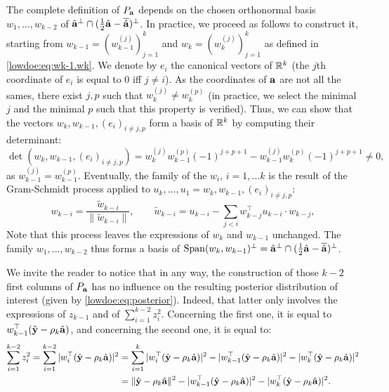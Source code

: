 {The complete definition of $P_{\mathbf{a}}$ depends on the chosen orthonormal basis $w_1,\dots,w_{k-2}$ of $\hat{\mathbf{a}}^\perp\cap(\frac{1}{2}\hat{\mathbf{a}}-\overline{\hat{\mathbf{a}}})^\perp$.
In practice, we proceed as follows to construct it, starting from $w_{k-1}=(w_{k-1}^{(j)})_{j=1}^k$ and $w_k=(w_k^{(j)})_{j=1}^k$ as defined in \cref{lowdoe:eq:wk-1.wk}. 
We denote by $e_i$ the canonical vectors of $\mathbb{R}^k$ (the $j$th coordinate of $e_i$ is equal to $0$ iff $j\ne i$). As the coordinates of $\mathbf{a}$ are not all the sames, there exist $j,p$ such that $w_{k}^{(j)}\ne w_{k}^{(p)}$ (in practice, we select the minimal $j$ and the minimal $p$ such that this property is verified). Thus, we can show that the vectors $w_k,w_{k-1},(e_i)_{i\ne j,p}$ form a basis of $\mathbb{R}^k$ by computing their determinant:
    \begin{equation}
        \det(w_k,w_{k-1},(e_i)_{i\ne j,p}) = w_k^{(j)}w_{k-1}^{(p)}(-1)^{j+p+1} - w_{k-1}^{(j)}w_k^{(p)}(-1)^{j+p+1}\ne 0,
    \end{equation}
as $w_{k-1}^{(j)}=w_{k-1}^{(p)}$.
Eventually, the family of the $w_i,\,i=1,\dots k$ is the result of the Gram-Schmidt process applied to $u_k,\dots,u_1=w_k,w_{k-1},(e_i)_{i\ne j,p}$: 
    \begin{equation}
        w_{k-i} = \frac{\tilde w_{k-i}}{\|\tilde w_{k-i}\|},\qquad \tilde w_{k-i} = u_{k-i} - \sum_{j<i} w_{k-j}^{\top}u_{k-i}\cdot w_{k-j}, 
    \end{equation}
Note that this process leaves the expressions of $w_k$ and $w_{k-1}$ unchanged. The family $w_1,\dots,w_{k-2}$ thus forms a basis of $\operatorname{Span}(w_k,w_{k-1})^\perp=\hat{\mathbf{a}}^\perp\cap(\frac{1}{2}\hat{\mathbf{a}}-\overline{\hat{\mathbf{a}}})^\perp$.

We invite the reader to notice that in any way, the construction of those $k-2$ first columns of $P_{\mathbf{a}}$ has no influence on the resulting posterior distribution of interest (given by \cref{lowdoe:eq:posterior}). Indeed, that latter only involves the expressions of $z_{k-1}$ and of $\sum_{i=1}^{k-2}z_i^2$. Concerning the first one, it is equal to $w_{k-1}^{\top}(\hat{\mathbf{y}}-\rho_k\hat{\mathbf{a}})$, and concerning the second one, it is equal to:
    \begin{align*}
            \sum_{i=1}^{k-2}z_i^2=\sum_{i=1}^{k-2}|w_i^{\top}(\hat{\mathbf{y}}-\rho_k\hat{\mathbf{a}})|^2&=\sum_{i=1}^{k}|w_i^{\top}(\hat{\mathbf{y}}-\rho_k\hat{\mathbf{a}})|^2-|w_{k-1}^{\top}(\hat{\mathbf{y}}-\rho_k\hat{\mathbf{a}} )|^2-|w_k^{\top}(\hat{\mathbf{y}}-\rho_k\hat{\mathbf{a}} )|^2\\
                &=\|\hat{\mathbf{y}}-\rho_k\hat{\mathbf{a}}\|^2-|w_{k-1}^{\top}(\hat{\mathbf{y}}-\rho_k\hat{\mathbf{a}} )|^2-|w_k^{\top}(\hat{\mathbf{y}}-\rho_k\hat{\mathbf{a}} )|^2.
        \end{align*}
    }


\newpage
\thispagestyle{empty}

